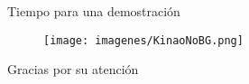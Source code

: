 \documentclass{beamer}
\begin{document}









	\begin{frame}
		\Huge{\centerline{Tiempo para una demostración}}

		\begin{figure}
			\centering
			\texttt{[image: imagenes/KinaoNoBG.png]}
		\end{figure}

	\end{frame}
	\begin{frame}
		\Huge{\centerline{Gracias por su atención}}
	\end{frame}
\end{document}
